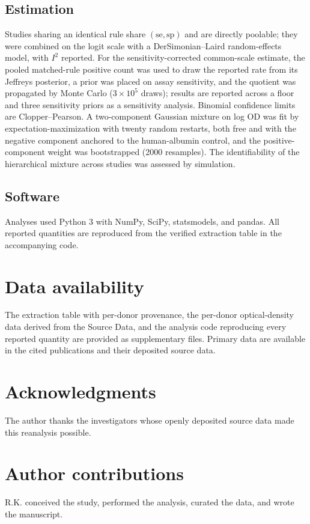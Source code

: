\documentclass[11pt]{article}
\begin{document}
\subsection{Estimation}
Studies sharing an identical rule share $(\mathrm{se},\mathrm{sp})$ and are directly poolable; they were combined on the logit scale with a DerSimonian--Laird random-effects model, with $I^2$ reported. For the sensitivity-corrected common-scale estimate, the pooled matched-rule positive count was used to draw the reported rate from its Jeffreys posterior, a prior was placed on assay sensitivity, and the quotient was propagated by Monte Carlo ($3\times10^5$ draws); results are reported across a floor and three sensitivity priors as a sensitivity analysis. Binomial confidence limits are Clopper--Pearson. A two-component Gaussian mixture on log OD was fit by expectation-maximization with twenty random restarts, both free and with the negative component anchored to the human-albumin control, and the positive-component weight was bootstrapped (2000 resamples). The identifiability of the hierarchical mixture across studies was assessed by simulation.

\subsection{Software}
Analyses used Python 3 with NumPy, SciPy, statsmodels, and pandas. All reported quantities are reproduced from the verified extraction table in the accompanying code.

\section*{Data availability}
The extraction table with per-donor provenance, the per-donor optical-density data derived from the \citet{simhadri2026} Source Data, and the analysis code reproducing every reported quantity are provided as supplementary files. Primary data are available in the cited publications and their deposited source data.

\section*{Acknowledgments}
The author thanks the investigators whose openly deposited source data made this reanalysis possible.

\section*{Author contributions}
R.K. conceived the study, performed the analysis, curated the data, and wrote the manuscript.
\end{document}
